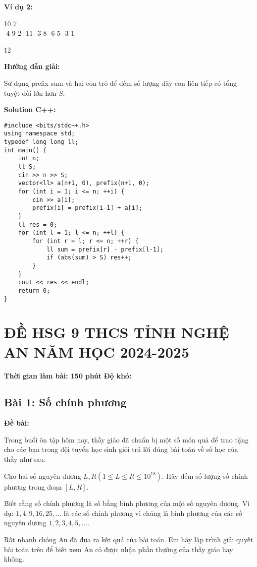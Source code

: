 \documentclass[12pt]{scrartcl}  %
\begin{document}
\textbf{Ví dụ 2:}
\begin{tcolorbox}[colback=gray!5!white, colframe=blue!50!black, title=Input]
10 7\\
-4 9 2 -11 -3 8 -6 5 -3 1
\end{tcolorbox}
\begin{tcolorbox}[colback=gray!5!white, colframe=green!50!black, title=Output]
12
\end{tcolorbox}

\textbf{Hướng dẫn giải:}

Sử dụng prefix sum và hai con trỏ để đếm số lượng dãy con liên tiếp có tổng tuyệt đối lớn hơn $S$.

\textbf{Solution C++:}
\begin{lstlisting}
#include <bits/stdc++.h>
using namespace std;
typedef long long ll;
int main() {
    int n;
    ll S;
    cin >> n >> S;
    vector<ll> a(n+1, 0), prefix(n+1, 0);
    for (int i = 1; i <= n; ++i) {
        cin >> a[i];
        prefix[i] = prefix[i-1] + a[i];
    }
    ll res = 0;
    for (int l = 1; l <= n; ++l) {
        for (int r = l; r <= n; ++r) {
            ll sum = prefix[r] - prefix[l-1];
            if (abs(sum) > S) res++;
        }
    }
    cout << res << endl;
    return 0;
}
\end{lstlisting}

\section{ĐỀ HSG 9 THCS TỈNH NGHỆ AN NĂM HỌC 2024-2025}
\textbf{Thời gian làm bài: 150 phút}
\textbf{Độ khó: }
\subsection{Bài 1: Số chính phương}

\textbf{Đề bài:}

Trong buổi ôn tập hôm nay, thầy giáo đã chuẩn bị một số món quà để trao tặng cho các bạn trong đội tuyển học sinh giỏi trả lời đúng bài toán về số học của thầy như sau: 

Cho hai số nguyên dương $L, R (1 \leq L \leq R \leq 10^{18})$. Hãy đếm số lượng số chính phương trong đoạn $[L, R]$.

Biết rằng số chính phương là số bằng bình phương của một số nguyên dương. Ví dụ: $1, 4, 9, 16, 25, ...$ là các số chính phương vì chúng là bình phương của các số nguyên dương $1, 2, 3, 4, 5, ...$.

Rất nhanh chóng An đã đưa ra kết quả của bài toán. Em hãy lập trình giải quyết bài toán trên để biết xem An có được nhận phần thưởng của thầy giáo hay không.
\end{document}

